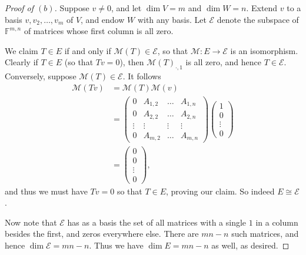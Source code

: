 \documentclass{extarticle}
\newcommand{\F}{\mathbb{F}}
\newcommand{\mat}{\mathcal{M}}
\begin{document}
\begin{proof}[Proof of $(b)$]
Suppose $v\neq 0$, and let $\dim V = m$ and $\dim W = n$.   Extend $v$ to a basis $v, v_2, \dots, v_m$ of $V$, and endow $W$ with any basis.  Let $\mathcal{E}$ denote the subspace of $\F^{m,n}$ of matrices whose first column is all zero.  
\par We claim $T\in E$ if and only if $\mat(T)\in \mathcal{E}$, so that $\mat: E\to \mathcal{E}$ is an isomorphism.  Clearly if $T\in E$ (so that $Tv = 0$), then $\mat(T)_{\cdot, 1}$ is all zero, and hence $T\in\mathcal{E}$.  Conversely, suppose $\mat(T)\in \mathcal{E}$.  It follows
\begin{align*}
\mat(Tv) &= \mat(T)\mat(v)\\ 
&= \begin{pmatrix}
0 &A_{1, 2} &\dots &A_{1,n}\\ 
0 &A_{2,2} &\dots &A_{2,n}\\
\vdots &\vdots &\vdots &\vdots\\
0 &A_{m,2} &\dots &A_{m,n}
\end{pmatrix}
\begin{pmatrix}1\\ 0\\ \vdots\\ 0\end{pmatrix}\\
&= \begin{pmatrix}0\\ 0\\ \vdots\\ 0\end{pmatrix},
\end{align*}
and thus we must have $Tv = 0$ so that $T\in E$, proving our claim.  So indeed $E\cong \mathcal{E}$.  
\par Now note that $\mathcal{E}$ has as a basis the set of all matrices with a single $1$ in a column besides the first, and zeros everywhere else.  There are $mn - n$ such matrices, and hence $\dim \mathcal{E} = mn - n$.  Thus we have $\dim E = mn - n$ as well, as desired.  
\end{proof}
\end{document}
